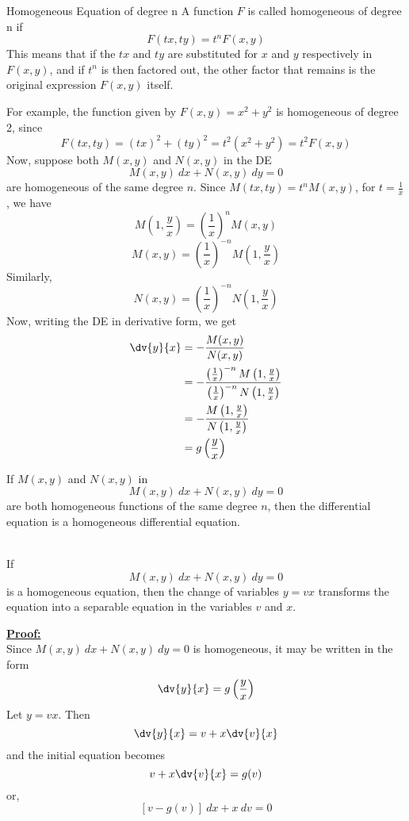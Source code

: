 \begin{definition}{Homogeneous Equation of degree n}{}
    A function $F$ is called homogeneous of degree n if \[
        F(tx,ty) = t^nF(x,y)
    \] This means that if the $tx$ and $ty$ are substituted for $x$ and $y$ respectively in $F(x,y)$, and if $t^n$ is then factored out, the other factor that remains is the original expression $F(x,y)$ itself.
\end{definition}
For example, the function given by $F(x,y) = x^2+y^2$ is homogeneous of degree 2, since \[
    F(tx,ty) = (tx)^2+(ty)^2 = t^2(x^2+y^2) = t^2F(x,y)
\]
Now, suppose both $M(x,y)$ and $N(x,y)$ in the DE \[
    M(x,y) \: d{x} + N(x,y) \: d{y} = 0
\] are homogeneous of the same degree $n$. Since $M(tx,ty) = t^n M(x,y)$, for $t = \frac{1}{x}$, we have
\[ M \left( 1,\frac{y}{x} \right) = \left( \frac{1}{x} \right)^n M(x,y) \]
\[ M(x,y) = \left( \frac{1}{x} \right)^{-n} M\left( 1, \frac{y}{x} \right) \]
Similarly, \[
    N(x,y) = \left( \frac{1}{x} \right)^{-n} N\left( 1, \frac{y}{x} \right)
\]
Now, writing the DE in derivative form, we get
\begin{align*}
    \dv{y}{x} &= - \frac{M(x,y)}{N(x,y)} \\
    &= - \frac{ \left(\frac{1}{x}\right)^{-n} M\left(1,\frac{y}{x}\right) }{ \left(\frac{1}{x}\right)^{-n} N\left(1,\frac{y}{x}\right) } \\
    &= - \frac{M\left(1,\frac{y}{x}\right)}{N\left(1,\frac{y}{x}\right)} \\
    &= g\left(\frac{y}{x}\right)
\end{align*}

\begin{note}{}
    If $M(x,y)$ and $N(x,y)$ in \[
        M(x,y) \: d{x} + N(x,y) \: d{y} = 0
    \] are both homogeneous functions of the same degree $n$, then the differential equation is a homogeneous differential equation.
\end{note}

\begin{theorem}{}{}
    \\If
    \begin{equation}
        M(x,y) \: d{x} + N(x,y) \: d{y} = 0
    \end{equation}
    is a homogeneous equation, then the change of variables $y = vx$ transforms the equation into a separable equation in the variables $v$ and $x$.
\end{theorem} \vspace{0.5cm}

\underline{\textbf{Proof:}} \\
Since $M(x,y) \: d{x} + N(x,y) \: d{y} = 0$ is homogeneous, it may be written in the form \[
    \dv{y}{x} = g \left( \frac{y}{x} \right)
\] Let $y = vx$. Then \[
    \dv{y}{x} = v + x\dv{v}{x}
\] and the initial equation becomes \[
    v + x\dv{v}{x} = g(v)
\] or, \[
    [v - g(v)] \: d{x} + x \: d{v} = 0
\]

